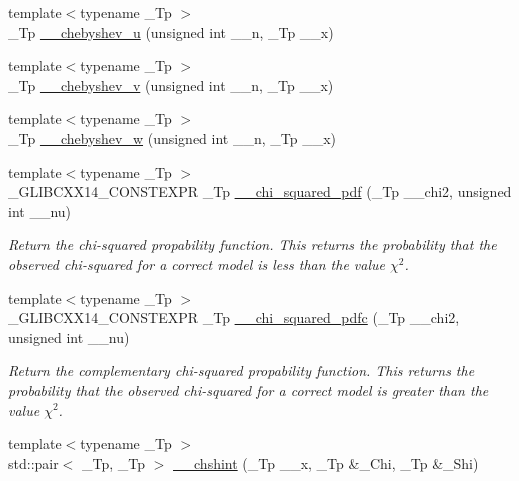 \begin{DoxyCompactItemize}
\item 
{\footnotesize template$<$typename \+\_\+\+Tp $>$ }\\\+\_\+\+Tp \hyperlink{namespacestd_1_1____detail_aa3289db0a53f55007bc10dc94f15c1f7}{\+\_\+\+\_\+chebyshev\+\_\+u} (unsigned int \+\_\+\+\_\+n, \+\_\+\+Tp \+\_\+\+\_\+x)
\item 
{\footnotesize template$<$typename \+\_\+\+Tp $>$ }\\\+\_\+\+Tp \hyperlink{namespacestd_1_1____detail_a684b312a311bbe2065a2633220f4507d}{\+\_\+\+\_\+chebyshev\+\_\+v} (unsigned int \+\_\+\+\_\+n, \+\_\+\+Tp \+\_\+\+\_\+x)
\item 
{\footnotesize template$<$typename \+\_\+\+Tp $>$ }\\\+\_\+\+Tp \hyperlink{namespacestd_1_1____detail_ae220390e755bdc4908e040fd68426d14}{\+\_\+\+\_\+chebyshev\+\_\+w} (unsigned int \+\_\+\+\_\+n, \+\_\+\+Tp \+\_\+\+\_\+x)
\item 
{\footnotesize template$<$typename \+\_\+\+Tp $>$ }\\\+\_\+\+G\+L\+I\+B\+C\+X\+X14\+\_\+\+C\+O\+N\+S\+T\+E\+X\+P\+R \+\_\+\+Tp \hyperlink{namespacestd_1_1____detail_a4f1652a699029ddb7f38dbcc6f0c0371}{\+\_\+\+\_\+chi\+\_\+squared\+\_\+pdf} (\+\_\+\+Tp \+\_\+\+\_\+chi2, unsigned int \+\_\+\+\_\+nu)
\begin{DoxyCompactList}\small\item\em Return the chi-\/squared propability function. This returns the probability that the observed chi-\/squared for a correct model is less than the value $ \chi^2 $. \end{DoxyCompactList}\item 
{\footnotesize template$<$typename \+\_\+\+Tp $>$ }\\\+\_\+\+G\+L\+I\+B\+C\+X\+X14\+\_\+\+C\+O\+N\+S\+T\+E\+X\+P\+R \+\_\+\+Tp \hyperlink{namespacestd_1_1____detail_a0e23bbba24b0d9ea8ab231a9ae88e503}{\+\_\+\+\_\+chi\+\_\+squared\+\_\+pdfc} (\+\_\+\+Tp \+\_\+\+\_\+chi2, unsigned int \+\_\+\+\_\+nu)
\begin{DoxyCompactList}\small\item\em Return the complementary chi-\/squared propability function. This returns the probability that the observed chi-\/squared for a correct model is greater than the value $ \chi^2 $. \end{DoxyCompactList}\item 
{\footnotesize template$<$typename \+\_\+\+Tp $>$ }\\std\+::pair$<$ \+\_\+\+Tp, \+\_\+\+Tp $>$ \hyperlink{namespacestd_1_1____detail_aa07abc4dac6cf589ccd12d3ce40277cf}{\+\_\+\+\_\+chshint} (\+\_\+\+Tp \+\_\+\+\_\+x, \+\_\+\+Tp \&\+\_\+\+Chi, \+\_\+\+Tp \&\+\_\+\+Shi)

\end{DoxyCompactItemize}
